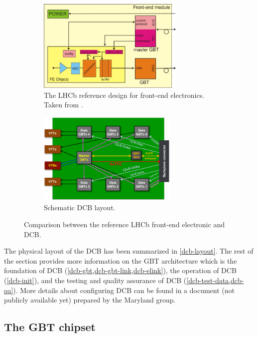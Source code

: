 \begin{figure}[!htb]
    \centering
    \begin{subfigure}[t]{0.46\textwidth}
        \centering
        \includegraphics[height=12em]{./figs-ut-upgrade/dcb/lhcb_ref_fe.pdf}
        \caption{
            The LHCb reference design for front-end electronics.
            Taken from \cite{Wyllie:2011sya}.
        }
        \label{fig:lhcb-ref-fe}
    \end{subfigure}
    \hfill
    \begin{subfigure}[t]{0.46\textwidth}
        \centering
        \includegraphics[height=12em]{./figs-ut-upgrade/dcb/dcb_schematic.pdf}
        \caption{
            Schematic DCB layout.
        }
        \label{fig:dcb-schematic}
    \end{subfigure}

    \caption{
        Comparison between the reference LHCb front-end electronic and DCB.
    }
\end{figure}

The physical layout of the DCB has been summarized in \cref{dcb-layout}.
The rest of the section provides more information
on the GBT architecture which is the foundation of DCB
(\cref{dcb-gbt,dcb-gbt-link,dcb-elink}),
the operation of DCB (\cref{dcb-init}),
and the testing and quality assurance of DCB (\cref{dcb-test-data,dcb-qa}).
More details about configuring DCB can be found in a document
(not publicly available yet) prepared by the Maryland group.


\subsection{The GBT chipset}
\label{dcb-gbt}

